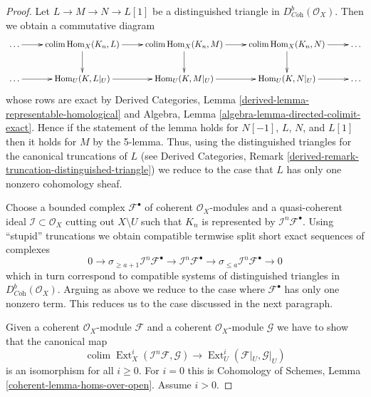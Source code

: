 \documentclass[10pt,a4paper]{amsart}
\theoremstyle{plain}
\theoremstyle{definition}
\theoremstyle{remark}
\numberwithin{equation}{subsection}
\def\colim{\mathop{\mathrm{colim}}\nolimits}
\def\Hom{\mathop{\mathrm{Hom}}\nolimits}
\def\Ext{\mathop{\mathrm{Ext}}\nolimits}
\begin{document}
\begin{proof}
Let $L \to M \to N \to L[1]$ be a distinguished triangle in
$D^b_{\textit{Coh}}(\mathcal{O}_X)$. Then we obtain
a commutative diagram
$$
\xymatrix{
\ldots \ar[r] &
\colim \Hom_X(K_n, L) \ar[r] \ar[d] &
\colim \Hom_X(K_n, M) \ar[r] \ar[d] &
\colim \Hom_X(K_n, N) \ar[r] \ar[d] &
\ldots \\
\ldots \ar[r] &
\Hom_U(K, L|_U) \ar[r] &
\Hom_U(K, M|_U) \ar[r] &
\Hom_U(K, N|_U) \ar[r] &
\ldots
}
$$
whose rows are exact by Derived Categories, Lemma
\ref{derived-lemma-representable-homological} and
Algebra, Lemma \ref{algebra-lemma-directed-colimit-exact}.
Hence if the statement of the lemma holds for
$N[-1]$, $L$, $N$, and $L[1]$ then it holds for $M$ by the 5-lemma.
Thus, using the distinguished triangles
for the canonical truncations of $L$ (see Derived Categories, Remark
\ref{derived-remark-truncation-distinguished-triangle})
we reduce to the case that $L$ has only one nonzero cohomology sheaf.

\medskip\noindent
Choose a bounded complex $\mathcal{F}^\bullet$ of coherent
$\mathcal{O}_X$-modules and a quasi-coherent ideal
$\mathcal{I} \subset \mathcal{O}_X$ cutting out $X \setminus U$
such that $K_n$ is represented by $\mathcal{I}^n\mathcal{F}^\bullet$.
Using ``stupid'' truncations we obtain compatible termwise split short
exact sequences of complexes
$$
0 \to \sigma_{\geq a + 1} \mathcal{I}^n\mathcal{F}^\bullet \to
\mathcal{I}^n\mathcal{F}^\bullet \to
\sigma_{\leq a} \mathcal{I}^n\mathcal{F}^\bullet \to 0
$$
which in turn correspond to compatible systems of distinguished
triangles in $D^b_{\textit{Coh}}(\mathcal{O}_X)$.
Arguing as above we reduce to the case where $\mathcal{F}^\bullet$
has only one nonzero term. This reduces us to the case discussed in
the next paragraph.

\medskip\noindent
Given a coherent $\mathcal{O}_X$-module $\mathcal{F}$ and a coherent
$\mathcal{O}_X$-module $\mathcal{G}$ we
have to show that the canonical map
$$
\colim \Ext^i_X(\mathcal{I}^n\mathcal{F}, \mathcal{G})
\longrightarrow
\Ext^i_U(\mathcal{F}|_U, \mathcal{G}|_U)
$$
is an isomorphism for all $i \geq 0$. For $i = 0$ this is
Cohomology of Schemes, Lemma \ref{coherent-lemma-homs-over-open}.
Assume $i > 0$.


\end{proof}
\end{document}
